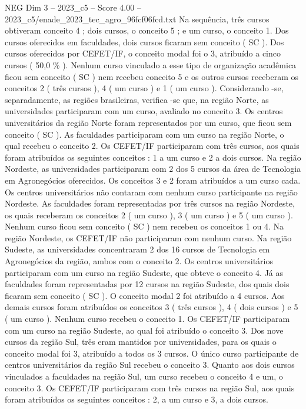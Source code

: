\begin{textsample}{NEG Dim 3 – 2023\_c5 – Score 4.00 – 2023\_c5/enade\_2023\_tec\_agro\_96fcf06fcd.txt}
Na sequência, três cursos obtiveram conceito 4 ; dois cursos, o conceito 5 ; e um curso, o conceito 1.
Dos cursos oferecidos em faculdades, dois cursos ficaram sem conceito ( SC ).
Dos cursos oferecidos por CEFET/IF, o conceito modal foi o 3, atribuído a cinco cursos ( 50,0 \% ).
Nenhum curso vinculado a esse tipo de organização acadêmica ficou sem conceito ( SC ) nem recebeu conceito 5 e os outros cursos receberam os conceitos 2 ( três cursos ), 4 ( um curso ) e 1 ( um curso ).
Considerando -se, separadamente, as regiões brasileiras, verifica -se que, na região Norte, as universidades participaram com um curso, avaliado no conceito 3.
Os centros universitários da região Norte foram representados por um curso, que ficou sem conceito ( SC ).
As faculdades participaram com um curso na região Norte, o qual recebeu o conceito 2.
Os CEFET/IF participaram com três cursos, aos quais foram atribuídos os seguintes conceitos : 1 a um curso e 2 a dois cursos.
Na região Nordeste, as universidades participaram com 2 dos 5 cursos da área de Tecnologia em Agronegócios oferecidos.
Os conceitos 3 e 2 foram atribuídos a um curso cada.
Os centros universitários não contaram com nenhum curso participante na região Nordeste.
As faculdades foram representadas por três cursos na região Nordeste, os quais receberam os conceitos 2 ( um curso ), 3 ( um curso ) e 5 ( um curso ).
Nenhum curso ficou sem conceito ( SC ) nem recebeu os conceitos 1 ou 4.
Na região Nordeste, os CEFET/IF não participaram com nenhum curso.
Na região Sudeste, as universidades concentraram 2 dos 16 cursos de Tecnologia em Agronegócios da região, ambos com o conceito 2.
Os centros universitários participaram com um curso na região Sudeste, que obteve o conceito 4.
Já as faculdades foram representadas por 12 cursos na região Sudeste, dos quais dois ficaram sem conceito ( SC ).
O conceito modal 2 foi atribuído a 4 cursos.
Aos demais cursos foram atribuídos os conceitos 3 ( três cursos ), 4 ( dois cursos ) e 5 ( um curso ).
Nenhum curso recebeu o conceito 1.
Os CEFET/IF participaram com um curso na região Sudeste, ao qual foi atribuído o conceito 3.
Dos nove cursos da região Sul, três eram mantidos por universidades, para os quais o conceito modal foi 3, atribuído a todos os 3 cursos.
O único curso participante de centros universitários da região Sul recebeu o conceito 3.
Quanto aos dois cursos vinculados a faculdades na região Sul, um curso recebeu o conceito 4 e um, o conceito 3.
Os CEFET/IF participaram com três cursos na região Sul, aos quais foram atribuídos os seguintes conceitos : 2, a um curso e 3, a dois cursos.

\end{textsample}
